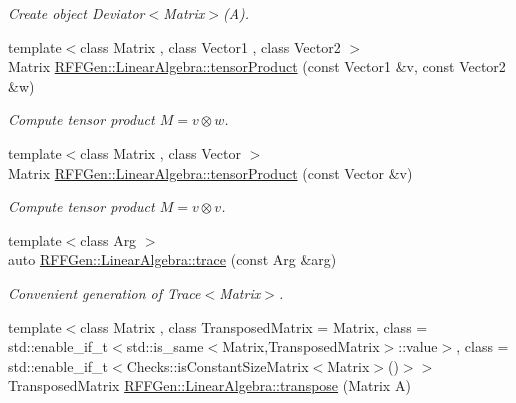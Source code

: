 \begin{DoxyCompactItemize}
\begin{DoxyCompactList}\small\item\em Create object Deviator$<$\-Matrix$>$(\-A). \end{DoxyCompactList}\item 
\hypertarget{group__LinearAlgebraGroup_gaa8e93771d2ca8b05ab77449c2b3f9b38}{{\footnotesize template$<$class Matrix , class Vector1 , class Vector2 $>$ }\\Matrix \hyperlink{group__LinearAlgebraGroup_gaa8e93771d2ca8b05ab77449c2b3f9b38}{R\-F\-F\-Gen\-::\-Linear\-Algebra\-::tensor\-Product} (const Vector1 \&v, const Vector2 \&w)}\label{group__LinearAlgebraGroup_gaa8e93771d2ca8b05ab77449c2b3f9b38}

\begin{DoxyCompactList}\small\item\em Compute tensor product $ M = v \otimes w $. \end{DoxyCompactList}\item 
\hypertarget{group__LinearAlgebraGroup_gac2461ba581a9fd80f9c622c5a15c3bfc}{{\footnotesize template$<$class Matrix , class Vector $>$ }\\Matrix \hyperlink{group__LinearAlgebraGroup_gac2461ba581a9fd80f9c622c5a15c3bfc}{R\-F\-F\-Gen\-::\-Linear\-Algebra\-::tensor\-Product} (const Vector \&v)}\label{group__LinearAlgebraGroup_gac2461ba581a9fd80f9c622c5a15c3bfc}

\begin{DoxyCompactList}\small\item\em Compute tensor product $ M = v \otimes v $. \end{DoxyCompactList}\item 
{\footnotesize template$<$class Arg $>$ }\\auto \hyperlink{group__LinearAlgebraGroup_ga8ede749982d71c466cfe12d92541a504}{R\-F\-F\-Gen\-::\-Linear\-Algebra\-::trace} (const Arg \&arg)
\begin{DoxyCompactList}\small\item\em Convenient generation of Trace$<$\-Matrix$>$. \end{DoxyCompactList}\item 
\hypertarget{group__LinearAlgebraGroup_ga547f56fe3fddb39aad3e80e94866a98b}{{\footnotesize template$<$class Matrix , class Transposed\-Matrix  = Matrix, class  = std\-::enable\-\_\-if\-\_\-t$<$std\-::is\-\_\-same$<$\-Matrix,\-Transposed\-Matrix$>$\-::value$>$, class  = std\-::enable\-\_\-if\-\_\-t$<$\-Checks\-::is\-Constant\-Size\-Matrix$<$\-Matrix$>$()$>$$>$ }\\Transposed\-Matrix \hyperlink{group__LinearAlgebraGroup_ga547f56fe3fddb39aad3e80e94866a98b}{R\-F\-F\-Gen\-::\-Linear\-Algebra\-::transpose} (Matrix A)}\label{group__LinearAlgebraGroup_ga547f56fe3fddb39aad3e80e94866a98b}


\end{DoxyCompactItemize}
